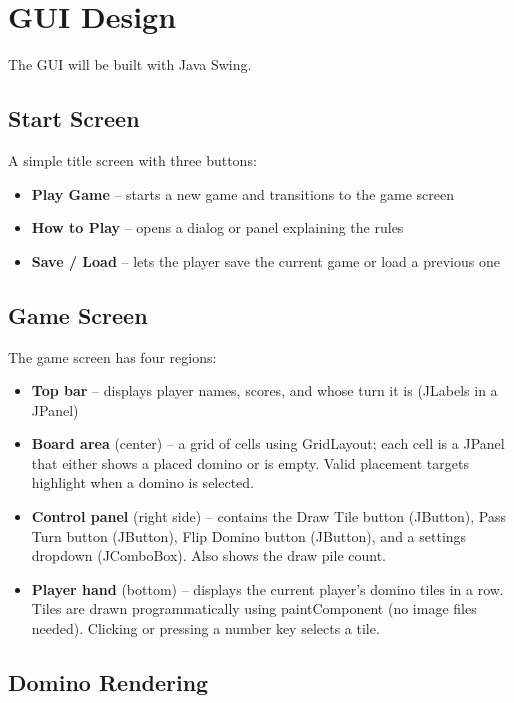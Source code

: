 \documentclass[11pt,a4paper]{article}
\begin{document}
\section{GUI Design}

The GUI will be built with Java Swing.

\subsection{Start Screen}

A simple title screen with three buttons:

\begin{itemize}[nosep]
  \item \textbf{Play Game} -- starts a new game and transitions to the game screen
  \item \textbf{How to Play} -- opens a dialog or panel explaining the rules
  \item \textbf{Save / Load} -- lets the player save the current game or load a previous one
\end{itemize}

\subsection{Game Screen}

The game screen has four regions:

\begin{itemize}[nosep]
  \item \textbf{Top bar} -- displays player names, scores, and whose turn it is (JLabels in a JPanel)
  \item \textbf{Board area} (center) -- a grid of cells using GridLayout; each cell is a JPanel that either shows a placed domino or is empty. Valid placement targets highlight when a domino is selected.
  \item \textbf{Control panel} (right side) -- contains the Draw Tile button (JButton), Pass Turn button (JButton), Flip Domino button (JButton), and a settings dropdown (JComboBox). Also shows the draw pile count.
  \item \textbf{Player hand} (bottom) -- displays the current player's domino tiles in a row. Tiles are drawn programmatically using paintComponent (no image files needed). Clicking or pressing a number key selects a tile.
\end{itemize}

\subsection{Domino Rendering}
\end{document}
